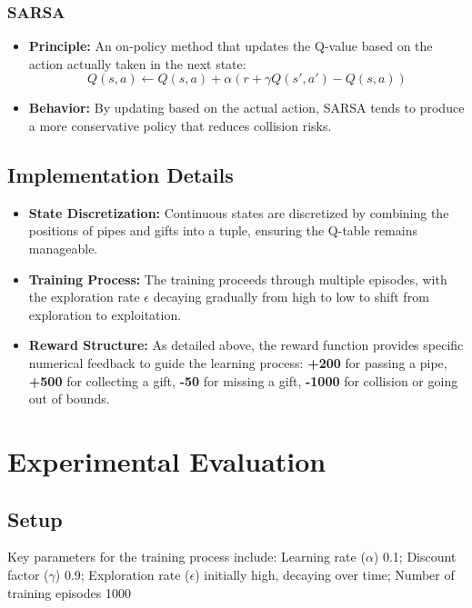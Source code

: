 \documentclass[9pt,a4paper]{article}
\begin{document}
\subsubsection{SARSA}
\begin{itemize}
    \item \textbf{Principle:} An on-policy method that updates the Q-value based on the action actually taken in the next state:
    \[
    Q(s,a) \leftarrow Q(s,a) + \alpha \left( r + \gamma Q(s',a') - Q(s,a) \right)
    \]
    \item \textbf{Behavior:} By updating based on the actual action, SARSA tends to produce a more conservative policy that reduces collision risks.
\end{itemize}

\subsection{Implementation Details}
\begin{itemize}
    \item \textbf{State Discretization:} Continuous states are discretized by combining the positions of pipes and gifts into a tuple, ensuring the Q-table remains manageable.
    \item \textbf{Training Process:} The training proceeds through multiple episodes, with the exploration rate \(\epsilon\) decaying gradually from high to low to shift from exploration to exploitation.
    \item \textbf{Reward Structure:} As detailed above, the reward function provides specific numerical feedback to guide the learning process: \textbf{+200} for passing a pipe, \textbf{+500} for collecting a gift, \textbf{-50} for missing a gift, \textbf{-1000} for collision or going out of bounds.

\end{itemize}

\section{Experimental Evaluation}
\subsection{Setup}
Key parameters for the training process include: Learning rate (\(\alpha\)) 0.1; Discount factor (\(\gamma\)) 0.9; Exploration rate (\(\epsilon\)) initially high, decaying over time; Number of training episodes 1000
\end{document}
